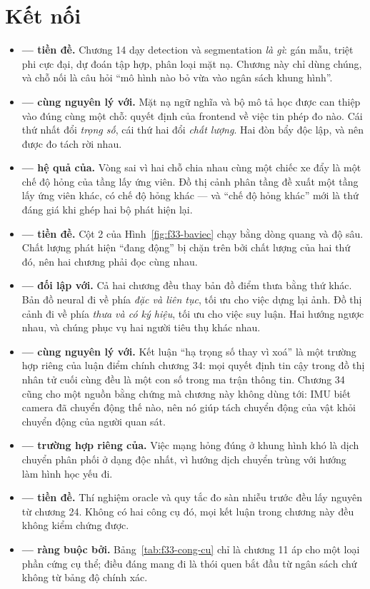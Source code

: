 \documentclass[../../deep_learning.tex]{subfiles}
\begin{document}
\section{Kết nối}
\begin{itemize}
\item \textbf{ --- tiền đề.} Chương 14 dạy detection và segmentation \emph{là gì}: gán mẫu, triệt phi cực đại, dự đoán tập hợp, phân loại mặt nạ. Chương này chỉ dùng chúng, và chỗ nối là câu hỏi ``mô hình nào bỏ vừa vào ngân sách khung hình''.
\item \textbf{ --- cùng nguyên lý với.} Mặt nạ ngữ nghĩa và bộ mô tả học được can thiệp vào đúng cùng một chỗ: quyết định của frontend về việc tin phép đo nào. Cái thứ nhất đổi \emph{trọng số}, cái thứ hai đổi \emph{chất lượng}. Hai đòn bẩy độc lập, và nên được đo tách rời nhau.
\item \textbf{ --- hệ quả của.} Vòng sai vì hai chỗ chia nhau cùng một chiếc xe đẩy là một chế độ hỏng của tầng lấy ứng viên. Đồ thị cảnh phân tầng đề xuất một tầng lấy ứng viên khác, có chế độ hỏng khác --- và ``chế độ hỏng khác'' mới là thứ đáng giá khi ghép hai bộ phát hiện lại.
\item \textbf{ --- tiền đề.} Cột 2 của Hình~\ref{fig:f33-baviec} chạy bằng dòng quang và độ sâu. Chất lượng phát hiện ``đang động'' bị chặn trên bởi chất lượng của hai thứ đó, nên hai chương phải đọc cùng nhau.
\item \textbf{ --- đối lập với.} Cả hai chương đều thay bản đồ điểm thưa bằng thứ khác. Bản đồ neural đi về phía \emph{đặc và liên tục}, tối ưu cho việc dựng lại ảnh. Đồ thị cảnh đi về phía \emph{thưa và có ký hiệu}, tối ưu cho việc suy luận. Hai hướng ngược nhau, và chúng phục vụ hai người tiêu thụ khác nhau.
\item \textbf{ --- cùng nguyên lý với.} Kết luận ``hạ trọng số thay vì xoá'' là một trường hợp riêng của luận điểm chính chương 34: mọi quyết định tin cậy trong đồ thị nhân tử cuối cùng đều là một con số trong ma trận thông tin. Chương 34 cũng cho một nguồn bằng chứng mà chương này không dùng tới: IMU biết camera đã chuyển động thế nào, nên nó giúp tách chuyển động của vật khỏi chuyển động của người quan sát.
\item \textbf{ --- trường hợp riêng của.} Việc mạng hỏng đúng ở khung hình khó là dịch chuyển phân phối ở dạng độc nhất, vì hướng dịch chuyển trùng với hướng làm hình học yếu đi.
\item \textbf{ --- tiền đề.} Thí nghiệm oracle và quy tắc đo sàn nhiễu trước đều lấy nguyên từ chương 24. Không có hai công cụ đó, mọi kết luận trong chương này đều không kiểm chứng được.
\item \textbf{ --- ràng buộc bởi.} Bảng~\ref{tab:f33-cong-cu} chỉ là chương 11 áp cho một loại phần cứng cụ thể; điều đáng mang đi là thói quen bắt đầu từ ngân sách chứ không từ bảng độ chính xác.
\end{itemize}
\end{document}
